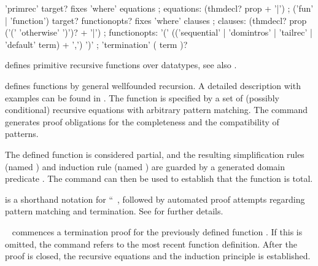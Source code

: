 \begin{isabellebody}
\begin{isamarkuptext}
  \begin{rail}
    'primrec' target? fixes 'where' equations
    ;
    equations: (thmdecl? prop + '|')
    ;
    ('fun' | 'function') target? functionopts? fixes 'where' clauses
    ;
    clauses: (thmdecl? prop ('(' 'otherwise' ')')? + '|')
    ;
    functionopts: '(' (('sequential' | 'domintros' | 'tailrec' | 'default' term) + ',') ')'
    ;
    'termination' ( term )?
  \end{rail}

  \begin{description}

  \item \hyperlink{command.HOL.primrec}{\mbox{}} defines primitive recursive
  functions over datatypes, see also \cite{isabelle-HOL}.

  \item \hyperlink{command.HOL.function}{\mbox{}} defines functions by general
  wellfounded recursion. A detailed description with examples can be
  found in \cite{isabelle-function}. The function is specified by a
  set of (possibly conditional) recursive equations with arbitrary
  pattern matching. The command generates proof obligations for the
  completeness and the compatibility of patterns.

  The defined function is considered partial, and the resulting
  simplification rules (named ) and induction rule
  (named ) are guarded by a generated domain
  predicate . The \hyperlink{command.HOL.termination}{\mbox{}}
  command can then be used to establish that the function is total.

  \item \hyperlink{command.HOL.fun}{\mbox{}} is a shorthand notation for ``\hyperlink{command.HOL.function}{\mbox{}}~, followed by automated
  proof attempts regarding pattern matching and termination.  See
  \cite{isabelle-function} for further details.

  \item \hyperlink{command.HOL.termination}{\mbox{}}~ commences a
  termination proof for the previously defined function .  If
  this is omitted, the command refers to the most recent function
  definition.  After the proof is closed, the recursive equations and
  the induction principle is established.


\end{description}
\end{isamarkuptext}
\end{isabellebody}
